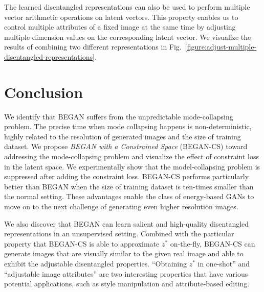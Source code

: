 \documentclass[runningheads]{llncs}
\begin{document}
    The learned disentangled representations can also be used to perform multiple vector arithmetic operations on latent vectors. This property enables us to control multiple attributes of a fixed image at the same time by adjusting multiple dimension values on the corresponding latent vector. We visualize the results of combining two different representations in Fig.~\ref{figure:adjust-multiple-disentangled-representations}.
    

\section{Conclusion}
    
    We identify that BEGAN suffers from the unpredictable mode-collapsing problem. The precise time when mode collapsing happens is non-deterministic, highly related to the resolution of generated images and the size of training dataset. We propose \emph{BEGAN with a Constrained Space} (BEGAN-CS) toward addressing the mode-collapsing problem and visualize the effect of constraint loss in the latent space. We experimentally show that the model-collapsing problem is suppressed after adding the constraint loss. BEGAN-CS performs particularly better than BEGAN when the size of training dataset is ten-times smaller than the normal setting. These advantages enable the class of energy-based GANs to move on to the next challenge of generating even higher resolution images.
    
    We also discover that BEGAN can learn salient and high-quality disentangled representations in an unsupervised setting. Combined with the particular property that BEGAN-CS is able to approximate $z^*$ on-the-fly, BEGAN-CS can generate images that are visually similar to the given real image and able to exhibit the adjustable disentangled properties. ``Obtaining $z^*$ in one-shot'' and ``adjustable image attributes'' are two interesting properties that have various potential applications, such as style manipulation and attribute-based editing.
    
\end{document}
